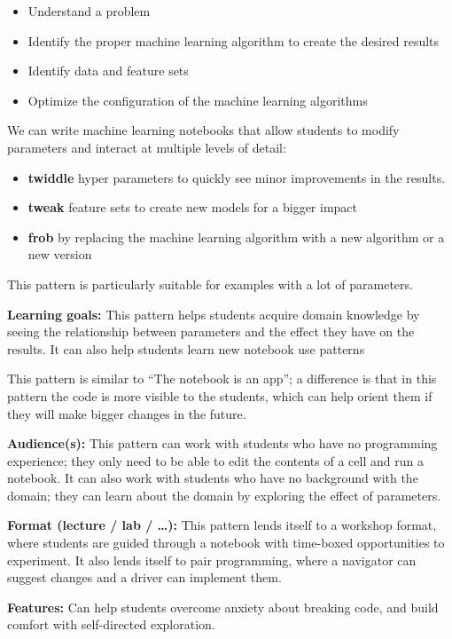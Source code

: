 \documentclass[]{book}
\providecommand{\tightlist}{%
  \setlength{\itemsep}{0pt}\setlength{\parskip}{0pt}}
\begin{document}
\begin{itemize}
\tightlist
\item
  Understand a problem
\item
  Identify the proper machine learning algorithm to create the desired
  results
\item
  Identify data and feature sets
\item
  Optimize the configuration of the machine learning algorithms
\end{itemize}

We can write machine learning notebooks that allow students to modify
parameters and interact at multiple levels of detail:

\begin{itemize}
\tightlist
\item
  \textbf{twiddle} hyper parameters to quickly see minor improvements in
  the results.
\item
  \textbf{tweak} feature sets to create new models for a bigger impact
\item
  \textbf{frob} by replacing the machine learning algorithm with a new
  algorithm or a new version
\end{itemize}

This pattern is particularly suitable for examples with a lot of
parameters.

\textbf{Learning goals:} This pattern helps students acquire domain
knowledge by seeing the relationship between parameters and the effect
they have on the results. It can also help students learn new notebook
use patterns

This pattern is similar to ``The notebook is an app''; a difference is
that in this pattern the code is more visible to the students, which can
help orient them if they will make bigger changes in the future.

\textbf{Audience(s):} This pattern can work with students who have no
programming experience; they only need to be able to edit the contents
of a cell and run a notebook. It can also work with students who have no
background with the domain; they can learn about the domain by exploring
the effect of parameters.

\textbf{Format (lecture / lab / \ldots{}):} This pattern lends itself to
a workshop format, where students are guided through a notebook with
time-boxed opportunities to experiment. It also lends itself to pair
programming, where a navigator can suggest changes and a driver can
implement them.

\textbf{Features:} Can help students overcome anxiety about breaking
code, and build comfort with self-directed exploration.
\end{document}
